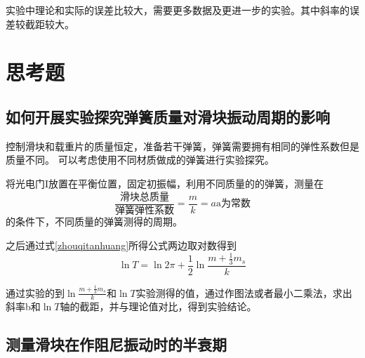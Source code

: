 \documentclass{ctexart}
\begin{document}
  实验中理论和实际的误差比较大，需要更多数据及更进一步的实验。其中斜率的误差较截距较大。
\newpage

\section{思考题}
  \subsection{如何开展实验探究弹簧质量对滑块振动周期的影响}
  控制滑块和载重片的质量恒定，准备若干弹簧，弹簧需要拥有相同的弹性系数但是质量不同。
  可以考虑使用不同材质做成的弹簧进行实验探究。

  将光电门I放置在平衡位置，固定初振幅，利用不同质量的的弹簧，测量在
  \begin{equation}
    \frac{\mbox{滑块总质量}}{\mbox{弹簧弹性系数}}=\frac{m}{k}=a\mbox{a为常数}
  \end{equation}
  的条件下，不同质量的弹簧测得的周期。
  
  之后通过式\ref{zhouqitanhuang}所得公式两边取对数得到
  \begin{equation}
    \ln T=\ln 2\pi + \frac{1}{2} \ln \frac{m+\frac{1}{3}m_{s}}{k}
  \end{equation}
  
  通过实验的到$\ln \frac{m+\frac{1}{3}m_{s}}{k}$和$\ln T$实验测得的值，通过作图法或者最小二乘法，求出
  斜率b和$\ln T$轴的截距，并与理论值对比，得到实验结论。
  \subsection{测量滑块在作阻尼振动时的半衰期}
\end{document}
